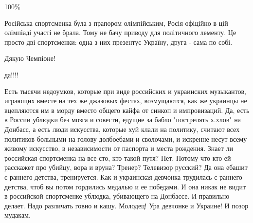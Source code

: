\begin{itemize}
100\%

 

Російська спортсменка була з прапором олімпійським, Росія офіційно в цій
олімпіаді участі не брала. Тому не бачу приводу для політичного лементу. Це
просто дві спортсменки: одна з них презентує Україну, друга - сама по собі.


 
Дякую Чемпіоне!

 

да!!!!

 

Есть тысячи недоумков, которые при виде российских и украинских музыкантов,
играющих вместе на тех же джазовых фестах, возмущаются, как же украинцы не
вцепляются им в морду вместо общего кайфа от синкоп и импровизаций. Да, есть в
России ублюдки без мозга и совести, едущие за бабло "пострелять х.хлов" на
Донбасс, а есть люди искусства, которые хуй клали на политику, считают всех
политиков больными на голову долбоебами и сволочами, и искренне несут всему
живому искусство, в независимости от паспорта и места рождения. Знает ли
российская спортсменка на все сто, кто такой путя? Нет. Потому что кто ей
расскажет про убийцу, вора и вруна? Тренер? Телевизор русский? Да она ебашит с
раннего детства, тренируется. Как и украинская девчонка трудилась с раннего
детства, чтоб вы потом гордились медалью и ее победами. И она никак не видит в
российской спортсменке ублюдка, убивающего на Донбассе. И правильно делает.
Надо различать говно и кашу. Молодец! Ура девчонке и Украине! И позор мудакам.


\end{itemize}
